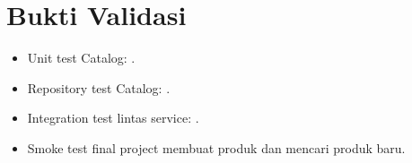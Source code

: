 \documentclass[11pt,a4paper]{article}
\begin{document}
\section*{Bukti Validasi}
\begin{itemize}
\item Unit test Catalog: .
\item Repository test Catalog: .
\item Integration test lintas service: .
\item Smoke test final project membuat produk dan mencari produk baru.
\end{itemize}
\end{document}
